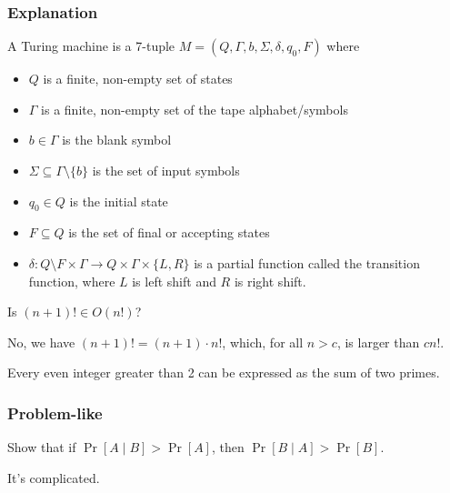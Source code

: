 \documentclass{article}
\theoremstyle{plain}
\theoremstyle{definition}
\theoremstyle{remark}
\begin{document}
\subsubsection{Explanation}

\begin{definition}
A Turing machine is a 7-tuple $M = (Q, \Gamma, b, \Sigma, \delta, q_0, F)$ where
\begin{itemize}
  \item $Q$ is a finite, non-empty set of states
  \item $\Gamma$ is a finite, non-empty set of the tape alphabet/symbols
  \item $b \in \Gamma$ is the blank symbol
  \item $\Sigma \subseteq \Gamma \setminus \{b\}$ is the set of input symbols
  \item $q_0 \in Q$ is the initial state
  \item $F \subseteq Q$ is the set of final or accepting states
  \item $\delta : Q \setminus F \times \Gamma \to Q \times \Gamma \times \{L, R\}$ is a partial function called the transition function, where $L$ is left shift and $R$ is right shift.
\end{itemize}
\end{definition}

\begin{example}
Is $(n+1)! \in O(n!)$?

No, we have $(n + 1)! = (n + 1) \cdot n!$, which, for all $n > c$, is larger than $cn!$.
\end{example}

\begin{conjecture}
Every even integer greater than 2 can be expressed as the sum of two primes.
\end{conjecture}

\subsubsection{Problem-like}

\begin{exercise}
Show that if $\Pr[A \mid B] > \Pr[A]$, then $\Pr[B \mid A] > \Pr[B]$.
\end{exercise}

\begin{problem}[Relationship]
It's complicated.
\end{problem}
\end{document}
